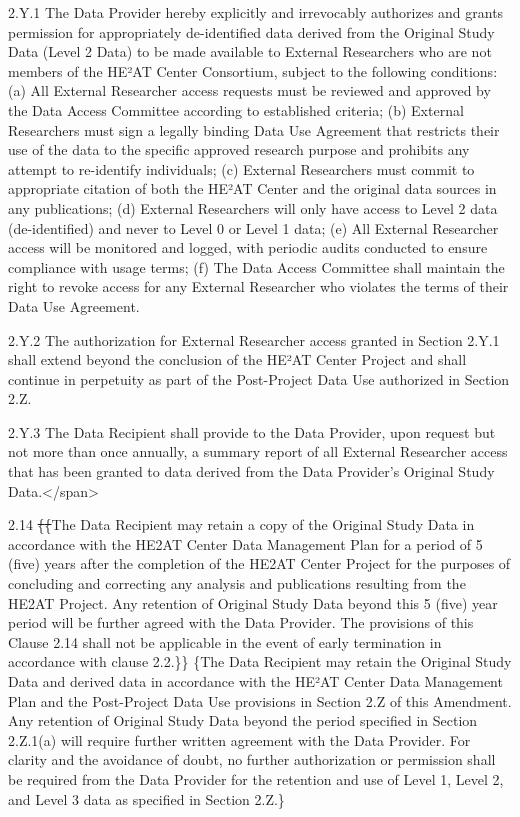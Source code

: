 \documentclass[12pt,letterpaper]{article}
\newcommand{\deleted}[1]{\textcolor{deletecolor}{\sout{#1}}}
\newcommand{\added}[1]{\textcolor{addcolor}{#1}}
\begin{document}
2.Y.1 The Data Provider hereby explicitly and irrevocably authorizes and grants permission for appropriately de-identified data derived from the Original Study Data (Level 2 Data) to be made available to External Researchers who are not members of the HE²AT Center Consortium, subject to the following conditions: (a) All External Researcher access requests must be reviewed and approved by the Data Access Committee according to established criteria; (b) External Researchers must sign a legally binding Data Use Agreement that restricts their use of the data to the specific approved research purpose and prohibits any attempt to re-identify individuals; (c) External Researchers must commit to appropriate citation of both the HE²AT Center and the original data sources in any publications; (d) External Researchers will only have access to Level 2 data (de-identified) and never to Level 0 or Level 1 data; (e) All External Researcher access will be monitored and logged, with periodic audits conducted to ensure compliance with usage terms; (f) The Data Access Committee shall maintain the right to revoke access for any External Researcher who violates the terms of their Data Use Agreement.

2.Y.2 The authorization for External Researcher access granted in Section 2.Y.1 shall extend beyond the conclusion of the HE²AT Center Project and shall continue in perpetuity as part of the Post-Project Data Use authorized in Section 2.Z.

2.Y.3 The Data Recipient shall provide to the Data Provider, upon request but not more than once annually, a summary report of all External Researcher access that has been granted to data derived from the Data Provider's Original Study Data.</span>

2.14       \deleted\{\deleted\{The Data Recipient may retain a copy of the Original Study Data in accordance with the HE2AT Center Data Management Plan for a period of 5 (five) years after the completion of the HE2AT Center Project for the purposes of concluding and correcting any analysis and publications resulting from the HE2AT Project.  Any retention of Original Study Data beyond this 5 (five) year period will be further agreed with the Data Provider. The provisions of this Clause 2.14 shall not be applicable in the event of early termination in accordance with clause 2.2.\}\} \added\{The Data Recipient may retain the Original Study Data and derived data in accordance with the HE²AT Center Data Management Plan and the Post-Project Data Use provisions in Section 2.Z of this Amendment. Any retention of Original Study Data beyond the period specified in Section 2.Z.1(a) will require further written agreement with the Data Provider. For clarity and the avoidance of doubt, no further authorization or permission shall be required from the Data Provider for the retention and use of Level 1, Level 2, and Level 3 data as specified in Section 2.Z.\}
\end{document}
